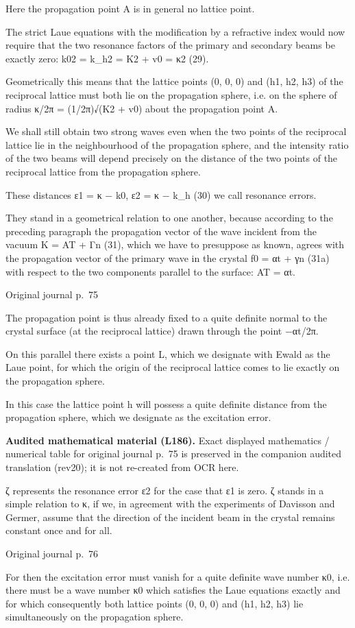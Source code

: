 \documentclass[10pt]{article}
\newcommand{\origpage}[1]{\par\medskip\noindent\hfill{\small\color{notegray}Original journal p.~#1}\hfill\mbox{}\par\smallskip}
\newcommand{\mathref}[2]{\par\smallskip\noindent\colorbox{gray!8}{\parbox{0.95\linewidth}{\small\color{notegray}\textbf{Audited mathematical material (L#1).} Exact displayed mathematics / numerical table for original journal p.~#2 is preserved in the companion audited translation (rev20); it is not re-created from OCR here.}}\par\smallskip}
\begin{document}
Here the propagation point A is in general no lattice point.\par
The strict Laue equations with the modification by a refractive index would now require that the two resonance factors of the primary and secondary beams be exactly zero: k02 = k\_h2 = K2 + v0 = κ2 (29).\par
Geometrically this means that the lattice points (0, 0, 0) and (h1, h2, h3) of the reciprocal lattice must both lie on the propagation sphere, i.e. on the sphere of radius κ/2π = (1/2π)√(K2 + v0) about the propagation point A.\par
We shall still obtain two strong waves even when the two points of the reciprocal lattice lie in the neighbourhood of the propagation sphere, and the intensity ratio of the two beams will depend precisely on the distance of the two points of the reciprocal lattice from the propagation sphere.\par
These distances ε1 = κ − k0, ε2 = κ − k\_h (30) we call resonance errors.\par
They stand in a geometrical relation to one another, because according to the preceding paragraph the propagation vector of the wave incident from the vacuum K = AT + Γn (31), which we have to presuppose as known, agrees with the propagation vector of the primary wave in the crystal f0 = αt + γn (31a) with respect to the two components parallel to the surface: AT = αt.\par
\origpage{75}
The propagation point is thus already fixed to a quite definite normal to the crystal surface (at the reciprocal lattice) drawn through the point −αt/2π.\par
On this parallel there exists a point L, which we designate with Ewald as the Laue point, for which the origin of the reciprocal lattice comes to lie exactly on the propagation sphere.\par
In this case the lattice point h will possess a quite definite distance from the propagation sphere, which we designate as the excitation error.\par
\mathref{186}{75}
ζ represents the resonance error ε2 for the case that ε1 is zero. ζ stands in a simple relation to κ, if we, in agreement with the experiments of Davisson and Germer, assume that the direction of the incident beam in the crystal remains constant once and for all.\par
\origpage{76}
For then the excitation error must vanish for a quite definite wave number κ0, i.e. there must be a wave number κ0 which satisfies the Laue equations exactly and for which consequently both lattice points (0, 0, 0) and (h1, h2, h3) lie simultaneously on the propagation sphere.\par
\end{document}

